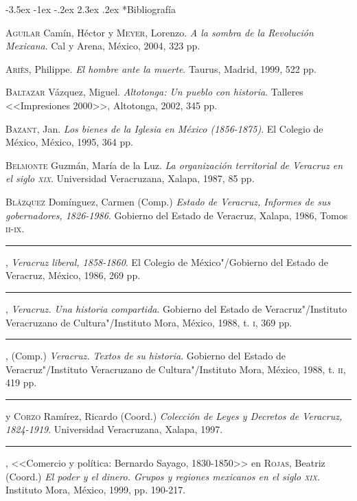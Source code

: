 \documentclass[14pt,twoside,final]{extbook} %
\makeatletter
\renewcommand\section{\@startsection {section}{1}{\z@}%
                                     {-3.5ex \@plus -1ex \@minus -.2ex}%
                                     {2.3ex \@plus .2ex}%
                                     {\normalfont\large\bfseries\sc}}
\makeatother
\begin{document}
\section*{Bibliografía}\label{sec:bibliografia}
\textsc{Aguilar} Camín, Héctor y \textsc{Meyer}, Lorenzo. \emph{A la sombra de la Revolución Mexicana}. Cal y Arena, México, 2004, 323 pp.

\textsc{Ariès}, Philippe. \emph{El hombre ante la muerte}. Taurus, Madrid, 1999, 522 pp.

\textsc{Baltazar} Vázquez, Miguel. \emph{Altotonga: Un pueblo con historia}. Talleres <<Impresiones 2000>>, Altotonga, 2002, 345 pp.

\textsc{Bazant}, Jan. \emph{Los bienes de la Iglesia en México (1856-1875)}. El Colegio de México, México, 1995, 364 pp.

\textsc{Belmonte} Guzmán, María de la Luz. \emph{La organización territorial de Veracruz en el siglo \textsc{xix}}. Universidad Veracruzana, Xalapa, 1987, 85 pp.

\textsc{Blázquez} Domínguez, Carmen (Comp.) \emph{Estado de Veracruz, Informes de sus gobernadores, 1826-1986}. Gobierno del Estado de Veracruz, Xalapa, 1986, Tomos \textsc{ii-ix}.

\rule{1cm}{0.4pt}, \emph{Veracruz liberal, 1858-1860}. El Colegio de México"/Gobierno del Estado de Veracruz, México, 1986, 269 pp.

\rule{1cm}{0.4pt}, \emph{Veracruz. Una historia compartida}. Gobierno del Estado de Veracruz"/Instituto Veracruzano de Cultura"/Instituto Mora, México, 1988, t. \textsc{i}, 369 pp.

\rule{1cm}{0.4pt}, (Comp.) \emph{Veracruz. Textos de su historia}. Gobierno del Estado de Veracruz"/Instituto Veracruzano de Cultura"/Instituto Mora, México, 1988, t. \textsc{ii}, 419 pp.

\rule{1cm}{0.4pt} y \textsc{Corzo} Ramírez, Ricardo (Coord.) \emph{Colección de Leyes y Decretos de Veracruz, 1824-1919}. Universidad Veracruzana, Xalapa, 1997.

\rule{1cm}{0.4pt}, <<Comercio y política: Bernardo Sayago, 1830-1850>> en \textsc{Rojas}, Beatriz (Coord.) \emph{El poder y el dinero. Grupos y regiones mexicanos en el siglo \textsc{xix}}. Instituto Mora, México, 1999, pp. 190-217.
\end{document}
